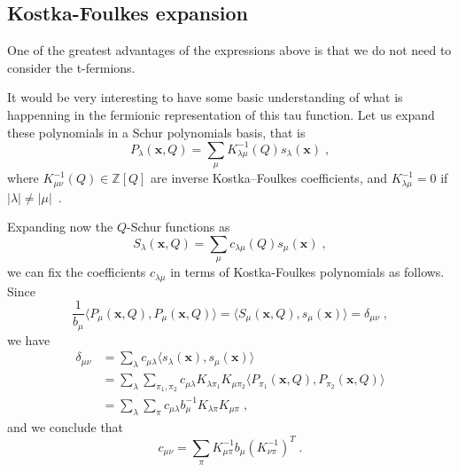 \documentclass[a4paper,11pt]{amsart}
\begin{document}

\subsection{Kostka-Foulkes expansion}

One of the greatest advantages of the expressions above is that we do not 
need to consider the t-fermions.

It would be very interesting to have some basic understanding of what
is happenning in the fermionic representation of this tau function.
Let us expand these polynomials in a Schur polynomials basis, that is
\begin{equation}
P_\lambda(\bm{x}, Q) = \sum_{\mu} K^{-1}_{\lambda \mu}(Q) s_\lambda(\bm{x})\; , 
\end{equation}
where \(K^{-1}_{\mu\nu}(Q) \in \mathbb{Z}[Q]\) are inverse
Kostka–Foulkes coefficients, and \(K^{-1}_{\lambda\mu} = 0 \) if
\(|\lambda|\neq |\mu|\)~\cite{Macdonald:1998, Wheeler:2018}.

Expanding now the \(Q\)-Schur functions as
\begin{equation}
  S_\lambda(\bm{x}, Q) = \sum_{\mu} c_{\lambda\mu}(Q) s_\mu(\bm{x})\; ,
\end{equation}
we can fix the coefficients \(c_{\lambda\mu}\) in terms of Kostka-Foulkes
polynomials as follows. Since~\cite{Macdonald:1998} 
\begin{equation}
  \frac{1}{b_\mu}\langle P_\mu(\bm{x}, Q), P_\mu(\bm{x}, Q)\rangle = \langle
  S_\mu(\bm{x}, Q), s_\mu(\bm{x})\rangle = \delta_{\mu\nu}\; ,  
\end{equation}
we have
\begin{equation}
  \begin{split}
\delta_{\mu\nu} & = \sum_\lambda c_{\mu\lambda}  \langle s_\lambda(\bm{x}), s_\mu(\bm{x})\rangle\\
& = \sum_\lambda \sum_{\pi_1, \pi_2} c_{\mu\lambda}  K_{\lambda \pi_1} K_{\mu \pi_2}
\langle P_{\pi_1}(\bm{x}, Q), P_{\pi_2}(\bm{x}, Q)\rangle \\ 
& = \sum_\lambda \sum_{\pi} c_{\mu\lambda} b_{\mu}^{-1}  K_{\lambda \pi} K_{\mu \pi}\; ,
  \end{split}
\end{equation}
and we conclude that 
\begin{equation}
\label{eq:indices}
c_{\mu \nu} = \sum_\pi K_{\mu\pi}^{-1} b_\mu (K_{\nu\pi}^{-1})^T\; .
\end{equation}
\end{document}
